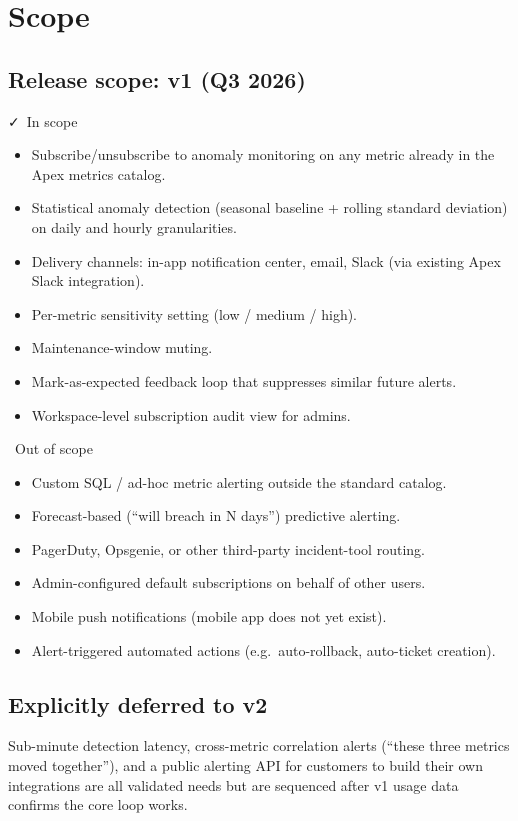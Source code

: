\section{Scope}

\subsection*{Release scope: v1 (Q3 2026)}

\begin{minipage}[t]{0.485\linewidth}
\begin{calloutbox}[height=8.6cm]{\faCheck\ In scope}
\footnotesize
\begin{itemize}
  \item Subscribe/unsubscribe to anomaly monitoring on any metric already in the Apex
    metrics catalog.
  \item Statistical anomaly detection (seasonal baseline + rolling standard deviation)
    on daily and hourly granularities.
  \item Delivery channels: in-app notification center, email, Slack (via existing Apex
    Slack integration).
  \item Per-metric sensitivity setting (low / medium / high).
  \item Maintenance-window muting.
  \item Mark-as-expected feedback loop that suppresses similar future alerts.
  \item Workspace-level subscription audit view for admins.
\end{itemize}
\end{calloutbox}
\end{minipage}\hfill
\begin{minipage}[t]{0.485\linewidth}
\begin{riskbox}[height=8.6cm]{\faTimes\ Out of scope}
\footnotesize
\begin{itemize}
  \item Custom SQL / ad-hoc metric alerting outside the standard catalog.
  \item Forecast-based (``will breach in N days'') predictive alerting.
  \item PagerDuty, Opsgenie, or other third-party incident-tool routing.
  \item Admin-configured default subscriptions on behalf of other users.
  \item Mobile push notifications (mobile app does not yet exist).
  \item Alert-triggered automated actions (e.g.\ auto-rollback, auto-ticket creation).
\end{itemize}
\end{riskbox}
\end{minipage}
\par

\subsection*{Explicitly deferred to v2}
Sub-minute detection latency, cross-metric correlation alerts (``these three metrics
moved together''), and a public alerting API for customers to build their own
integrations are all validated needs but are sequenced after v1 usage data confirms the
core loop works.
